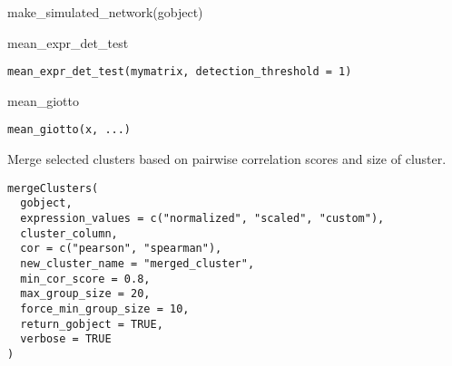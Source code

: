\documentclass[a4paper]{book}
\begin{document}
%
\begin{Examples}
\begin{ExampleCode}
    make_simulated_network(gobject)
\end{ExampleCode}
\end{Examples}
%
\begin{Description}\relax
mean\_expr\_det\_test
\end{Description}
%
\begin{Usage}
\begin{verbatim}
mean_expr_det_test(mymatrix, detection_threshold = 1)
\end{verbatim}
\end{Usage}
%
\begin{Description}\relax
mean\_giotto
\end{Description}
%
\begin{Usage}
\begin{verbatim}
mean_giotto(x, ...)
\end{verbatim}
\end{Usage}
%
\begin{Description}\relax
Merge selected clusters based on pairwise correlation scores and size of cluster.
\end{Description}
%
\begin{Usage}
\begin{verbatim}
mergeClusters(
  gobject,
  expression_values = c("normalized", "scaled", "custom"),
  cluster_column,
  cor = c("pearson", "spearman"),
  new_cluster_name = "merged_cluster",
  min_cor_score = 0.8,
  max_group_size = 20,
  force_min_group_size = 10,
  return_gobject = TRUE,
  verbose = TRUE
)
\end{verbatim}
\end{Usage}
%
\end{document}

